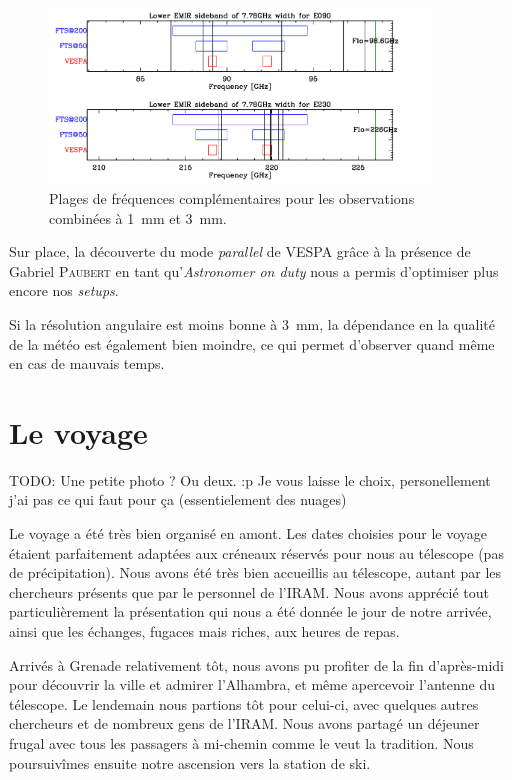 \documentclass[a4paper,10pt,french]{article}
\newcommand{\troismm}{\SI{3}{\milli\meter}}
\newcommand{\unmm}{\SI{1}{\milli\meter}}
\begin{document}
\begin{figure}[ht]
    \centering
    \includegraphics[width=0.9\textwidth]{specsetup-3mm-1mm-l.pdf}
    \caption{Plages de fréquences complémentaires pour les observations combinées à \unmm{} et \troismm.}
    \label{fig:specsetup_3mm_1mm_l}
\end{figure}

Sur place, la découverte du mode \textit{parallel} de VESPA grâce à la présence
de Gabriel \textsc{Paubert} en tant qu’\textit{Astronomer on duty} nous a
permis d’optimiser plus encore nos \textit{setups}.

Si la résolution angulaire est moins bonne à \troismm, la dépendance en la
qualité de la météo est également bien moindre, ce qui permet d’observer quand
même en cas de mauvais temps.

\section{Le voyage}

TODO: Une petite photo ? Ou deux. :p Je vous laisse le choix, personellement j'ai pas ce qui faut pour ça (essentielement des nuages)

Le voyage a été très bien organisé en amont. Les dates choisies pour le voyage
étaient parfaitement adaptées aux créneaux réservés pour nous au télescope (pas
de précipitation). Nous avons été très bien accueillis au télescope, autant par
les chercheurs présents que par le personnel de l’IRAM. Nous avons apprécié
tout particulièrement la présentation qui nous a été donnée le jour de notre
arrivée, ainsi que les échanges, fugaces mais riches, aux heures de repas.

Arrivés à Grenade relativement tôt, nous avons pu profiter de la fin
d’après-midi pour découvrir la ville et admirer l’Alhambra, et même apercevoir
l’antenne du télescope. Le lendemain nous partions tôt pour celui-ci, avec
quelques autres chercheurs et de nombreux gens de l’IRAM. Nous avons partagé un
déjeuner frugal avec tous les passagers à mi-chemin comme le veut la tradition.
Nous poursuivîmes ensuite notre ascension vers la station de ski.
\end{document}
